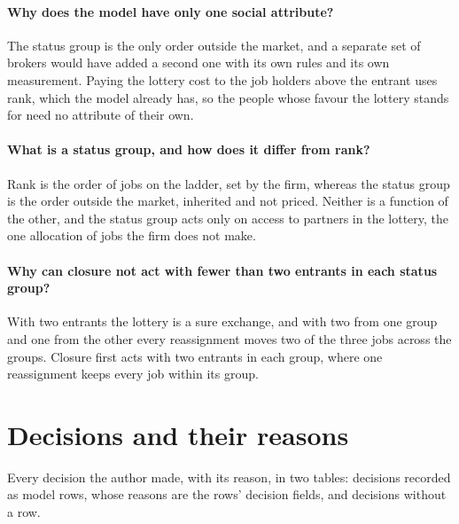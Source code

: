 \documentclass[10pt]{article}
\begin{document}
\paragraph{Why does the model have only one social attribute?} The status group is the only order outside the market, and a separate set of brokers would have added a second one with its own rules and its own measurement. Paying the lottery cost to the job holders above the entrant uses rank, which the model already has, so the people whose favour the lottery stands for need no attribute of their own.

\paragraph{What is a status group, and how does it differ from rank?} Rank is the order of jobs on the ladder, set by the firm, whereas the status group is the order outside the market, inherited and not priced. Neither is a function of the other, and the status group acts only on access to partners in the lottery, the one allocation of jobs the firm does not make.

\paragraph{Why can closure not act with fewer than two entrants in each status group?} With two entrants the lottery is a sure exchange, and with two from one group and one from the other every reassignment moves two of the three jobs across the groups. Closure first acts with two entrants in each group, where one reassignment keeps every job within its group.

\section{Decisions and their reasons}
Every decision the author made, with its reason, in two tables: decisions recorded as model rows, whose reasons are the rows’ decision fields, and decisions without a row.
\end{document}
